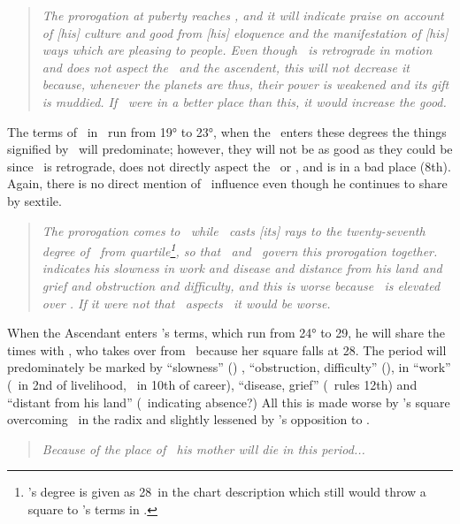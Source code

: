 \begin{quote}
\textsl{The prorogation at puberty reaches \Jupiter, and it will indicate praise on account of [his] culture and good from [his] eloquence and the manifestation of [his] ways which are pleasing to people. Even though \Jupiter\, is retrograde in motion and does not aspect the \Moon\, and the ascendent, this will not decrease it because, whenever the planets are thus, their power is weakened and its gift is muddied. If \Jupiter\, were in a better place than this, it would increase the good.}
\end{quote}

The terms of \Jupiter\, in \Scorpio\, run from 19° to 23°, when the \ASC\, enters these degrees the things signified by \Jupiter\, will predominate; however, they will not be as good as they could be since \Jupiter\, is retrograde, does not directly aspect the \Moon\, or \ASC, and is in a bad place (8th). Again, there is no direct mention of \Mars\, influence even though he continues to share by sextile.

\begin{quote}
\textsl{The prorogation comes to \Saturn\, while \Venus\, casts [its] rays to the twenty-seventh degree of \Scorpio\, from quartile\footnote{\Venus's degree is given as 28\Leo\, in the chart description which still would throw a square to \Saturn's terms in \Scorpio.}, so that \Saturn\, and \Venus\, govern this prorogation together. \Saturn\, indicates his slowness in work and disease and distance from his land and grief and obstruction and difficulty, and this is worse because \Mars\, is elevated over \Saturn. If it were not that \Jupiter\, aspects \Saturn\, it would be worse.}
\end{quote}

When the Ascendant enters \Saturn's terms, which run from 24° to 29\Scorpio,  he will share the times with \Venus, who takes over from \Mars\, because her square falls at 28\Scorpio. The period will predominately be marked by ``slowness'' (\Saturn) , ``obstruction, difficulty'' (\Square), in ``work'' (\Saturn\, in 2nd of livelihood, \Venus\, in 10th of career), ``disease, grief'' (\Venus\, rules 12th) and ``distant from his land'' (\Saturn\, indicating absence?) All this is made worse by \Mars's square overcoming \Saturn\, in the radix and slightly lessened by \Jupiter's opposition to \Saturn.

\begin{quote}
\textsl{Because of the place of \Saturn\, his mother will die in this period...}
\end{quote}

